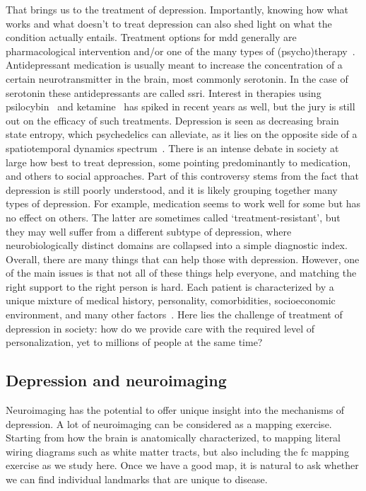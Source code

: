 That brings us to the treatment of depression.
Importantly, knowing how what works and what doesn't to treat depression can also shed light on what the condition actually entails.
Treatment options for \gls{mdd} generally are pharmacological intervention and/or one of the many types of (psycho)therapy~\parencite{Otte2016}.
Antidepressant medication is usually meant to increase the concentration of a certain neurotransmitter in the brain, most commonly serotonin.
In the case of serotonin these antidepressants are called \gls{ssri}.
Interest in therapies using psilocybin~\parencite{Carhart-Harris2016, Luppi2021, Daws2022, Singleton2022} and ketamine~\parencite{Krystal2019, Kotoula2021} has spiked in recent years as well, but the jury is still out on the efficacy of such treatments.
Depression is seen as decreasing brain state entropy, which psychedelics can alleviate, as it lies on the opposite side of a spatiotemporal dynamics spectrum~\parencite{Vohryzek2022}.
%
There is an intense debate in society at large how best to treat depression, some pointing predominantly to medication, and others to social approaches.
Part of this controversy stems from the fact that depression is still poorly understood, and it is likely grouping together many types of depression.
For example, medication seems to work well for some but has no effect on others.
The latter are sometimes called `treatment-resistant', but they may well suffer from a different subtype of depression, where neurobiologically distinct domains are collapsed into a simple diagnostic index.
Overall, there are many things that can help those with depression.
However, one of the main issues is that not all of these things help everyone, and matching the right support to the right person is hard.
Each patient is characterized by a unique mixture of medical history, personality, comorbidities, socioeconomic environment, and many other factors~\parencite{Trivedi2006}.
Here lies the challenge of treatment of depression in society: how do we provide care with the required level of personalization, yet to millions of people at the same time?

\subsection{Depression and neuroimaging}
\label{subsec:fc-neuroimaging}

Neuroimaging has the potential to offer unique insight into the mechanisms of depression.
A lot of neuroimaging can be considered as a mapping exercise.
Starting from how the brain is anatomically characterized, to mapping literal wiring diagrams such as white matter tracts, but also including the \gls{fc} mapping exercise as we study here.
Once we have a good map, it is natural to ask whether we can find individual landmarks that are unique to disease.


